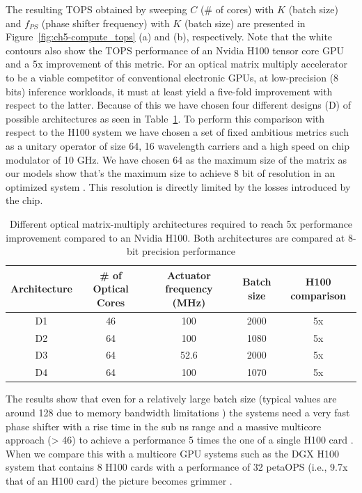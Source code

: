 The resulting TOPS obtained by sweeping $C$ (\# of cores) with $K$ (batch size) and $f_{PS}$ (phase shifter frequency) with $K$ (batch size) are presented in Figure~\ref{fig:ch5-compute_tops} (a) and (b), respectively.
Note that the white contours also show the TOPS performance of an Nvidia H100 tensor core GPU and a 5x improvement of this metric.
For an optical matrix multiply accelerator to be a viable competitor of conventional electronic GPUs, at low-precision (8 bits) inference workloads, it must at least yield a five-fold improvement with respect to the latter.
Because of this we have chosen four different designs (D) of possible architectures as seen in Table~\ref{tab:ch5-compute_tops}.
To perform this comparison with respect to the H100 system we have chosen a set of fixed ambitious metrics such as a unitary operator of size 64, 16 wavelength carriers \cite{noauthor_cw-wdm_nodate} and a high speed on chip modulator of 10 GHz.
We have chosen 64 as the maximum size of the matrix as our models show that's the maximum size to achieve 8 bit of resolution in an optimized system \cite{ward-foxton_optical_2021}.
This resolution is directly limited by the losses introduced by the chip.

\begin{table}
	\centering
	\caption{Different optical matrix-multiply architectures required to reach 5x performance improvement compared to an Nvidia H100. Both architectures are compared at 8-bit precision performance}\label{tab:ch5-compute_tops}
	\begin{tabular}{|c|c|c|c|c|}
		\hline
		Architecture & \# of Optical Cores & Actuator frequency (MHz) & Batch size & H100 comparison \\
		\hline
		D1           & 46                  & 100                      & 2000      & 5x              \\
		\hline
		D2           & 64                  & 100                      & 1080      & 5x              \\
		\hline
		D3           & 64                  & 52.6                     & 2000      & 5x              \\
		\hline
		D4           & 64                  & 100                      & 1070      & 5x              \\
		\hline
	\end{tabular}
\end{table}

The results show that even for a relatively large batch size (typical values are around 128 due to memory bandwidth limitations \cite{noauthor_llm_2023}) the systems need a very fast phase shifter with a rise time in the sub ns range and a massive multicore approach (> 46) to achieve a performance 5 times the one of a single H100 card \cite{noauthor_nvidia_nodate}.
When we compare this with a multicore GPU systems such as the DGX H100 system that contains 8 H100 cards with a performance of 32 petaOPS (i.e., 9.7x that of an H100 card) the picture becomes grimmer \cite{noauthor_nvidia_nodate-1}.

